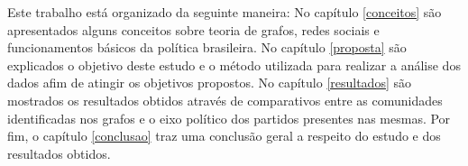 Este trabalho está organizado da seguinte maneira: No capítulo \ref{conceitos} são apresentados alguns conceitos  sobre teoria de grafos, redes sociais e funcionamentos básicos da política brasileira. No capítulo \ref{proposta} são explicados o objetivo deste estudo e o método utilizada para realizar a análise dos dados afim de atingir os objetivos propostos. No capítulo \ref{resultados} são mostrados os resultados obtidos através de comparativos entre as comunidades identificadas nos grafos e o eixo político dos partidos presentes nas mesmas. Por fim, o capítulo \ref{conclusao} traz uma conclusão geral a respeito do estudo e dos resultados obtidos.
